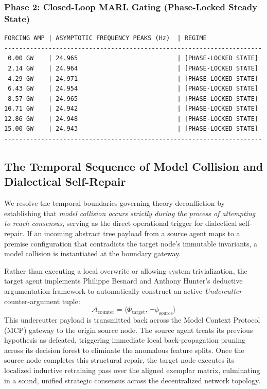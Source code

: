 \documentclass[11pt,fleqn]{article}
\begin{document}
\subsubsection{Phase 2: Closed-Loop MARL Gating (Phase-Locked Steady State)}
\begin{verbatim}
FORCING AMP | ASYMPTOTIC FREQUENCY PEAKS (Hz)  | REGIME
----------------------------------------------------------------------
 0.00 GW    | 24.965                           | [PHASE-LOCKED STATE]
 2.14 GW    | 24.964                           | [PHASE-LOCKED STATE]
 4.29 GW    | 24.971                           | [PHASE-LOCKED STATE]
 6.43 GW    | 24.954                           | [PHASE-LOCKED STATE]
 8.57 GW    | 24.965                           | [PHASE-LOCKED STATE]
10.71 GW    | 24.942                           | [PHASE-LOCKED STATE]
12.86 GW    | 24.948                           | [PHASE-LOCKED STATE]
15.00 GW    | 24.943                           | [PHASE-LOCKED STATE]
----------------------------------------------------------------------
\end{verbatim}

\subsection{The Temporal Sequence of Model Collision and Dialectical Self-Repair}
We resolve the temporal boundaries governing theory deconfliction by establishing that \textit{model collision occurs strictly during the process of attempting to reach consensus}, serving as the direct operational trigger for dialectical self-repair. If an incoming abstract tree payload from a source agent maps to a premise configuration that contradicts the target node's immutable invariants, a model collision is instantiated at the boundary gateway. 

Rather than executing a local overwrite or allowing system trivialization, the target agent implements Philippe Besnard and Anthony Hunter's deductive argumentation framework to automatically construct an active \textit{Undercutter} counter-argument tuple:
\begin{equation}
\mathcal{A}_{\text{counter}} = \langle \Phi_{\text{target}}, \, \neg \phi_{\text{source}} \rangle
\end{equation}
This undercutter payload is transmitted back across the Model Context Protocol (MCP) gateway to the origin source node. The source agent treats its previous hypothesis as defeated, triggering immediate local back-propagation pruning across its decision forest to eliminate the anomalous feature splits. Once the source node completes this structural repair, the target node executes its localized inductive retraining pass over the aligned exemplar matrix, culminating in a sound, unified strategic consensus across the decentralized network topology.
\end{document}
